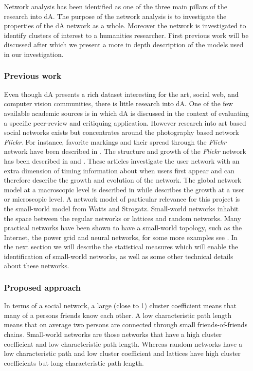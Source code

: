 Network analysis has been identified as one of the three main pillars of the research into dA. The purpose of the network analysis is to investigate the properties of the dA network as a whole. Moreover the network is investigated to identify clusters of interest to a humanities researcher. First previous work will be discussed after which we present a more in depth description of the models used in our investigation.

\subsubsection{Previous work}
Even though dA presents a rich dataset interesting for the art, social web, and computer vision communities, there is little research into dA. One of the few available academic sources is \cite{DaMasters} in which dA is discussed in the context of evaluating a specific peer-review and critiquing application.
However research into art based social networks exists but concentrates around the photography based network \textit{Flickr}. For instance,  favorite markings and their spread through the \textit{Flickr} network have been described in \cite{cha2009measurement}. The structure and growth of the \textit{Flickr} network has been described in \cite{kumar2006structure} and  \cite{leskovec2008microscopic}. These articles investigate the user network with an extra dimension of timing information about when users first appear and can therefore describe the growth and evolution of the network. The global network model at  a macroscopic level is described in \cite{kumar2006structure} while \cite{leskovec2008microscopic} describes the growth at a user or microscopic level. 
A network model of particular relevance for this project is the small-world model \cite{watts1998collective} from Watts and Strogatz. Small-world networks inhabit the space between the regular networks or lattices and random networks. Many practical networks have been shown to have a small-world topology, such as the Internet, the power grid and neural networks, for some more examples see \cite{albert2002statistical}. In the next section we will describe the statistical measures which will enable the identification of small-world networks, as well as some other technical details about these networks.


\subsubsection{Proposed approach}\label{net_proposed_approach}
In terms of a social network, a large (close to 1) cluster coefficient means that many of a persons friends know each other.  A low characteristic path length means that on average two persons are connected through small friends-of-friends chains.
Small-world networks are those networks that have a high cluster coefficient and low characteristic path length.  Whereas random networks have a low characteristic path and low cluster coefficient and lattices have high cluster coefficients but long characteristic path length. 


